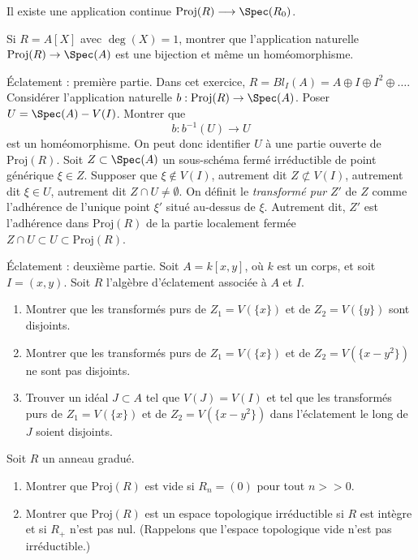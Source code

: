 \begin{remark}
\label{remark-continuous-proj-spec}
Il existe une application continue $ \text{Proj}(R) \longrightarrow \Spec(R_0) $.
\end{remark}

\begin{exercise}
\label{exercise-iso-polynomial-ring-one-variable}
Si $R = A[X]$ avec $\deg(X) = 1$, montrer que l'application naturelle
$\text{Proj}(R) \to \Spec(A)$ est une bijection et même
un homéomorphisme.
\end{exercise}

\begin{exercise}
\label{exercise-blowing-up-I}
Éclatement : première partie.
Dans cet exercice, $R = Bl_I(A) = A \oplus I \oplus I^2 \oplus \ldots$.
Considérer l'application naturelle $b : \text{Proj}(R) \to \Spec(A)$.
Poser $U = \Spec(A) - V(I)$. Montrer que
$$
b : b^{-1}(U) \longrightarrow U
$$
est un homéomorphisme.
On peut donc identifier $U$ à une partie ouverte de $\text{Proj}(R)$.
Soit $Z \subset \Spec(A)$ un sous-schéma fermé irréductible
de point générique $\xi \in Z$. Supposer que $\xi \not\in V(I)$,
autrement dit $Z \not\subset V(I)$, autrement dit
$\xi \in U$, autrement dit $Z\cap U \not = \emptyset$. On définit
le {\it transformé pur} $Z'$ de $Z$ comme l'adhérence de l'unique
point $\xi'$ situé au-dessus de $\xi$. Autrement dit,
$Z'$ est l'adhérence dans $\text{Proj}(R)$ de la partie localement fermée
$Z\cap U \subset U \subset \text{Proj}(R)$.
\end{exercise}

\begin{exercise}
\label{exercise-blowing-up-II}
Éclatement : deuxième partie.
Soit $A = k[x, y]$, où $k$ est un corps, et soit $I = (x, y)$.
Soit $R$ l'algèbre d'éclatement associée à $A$ et $I$.
\begin{enumerate}
\item Montrer que les transformés purs de $Z_1 = V(\{x\})$ et de
$Z_2 = V(\{y\})$ sont disjoints.
\item Montrer que les transformés purs de $Z_1 = V(\{x\})$ et de
$Z_2 = V(\{x-y^2\})$ ne sont pas disjoints.
\item Trouver un idéal $J \subset A$ tel que $V(J) = V(I)$
et tel que les transformés purs de $Z_1 = V(\{x\})$ et de
$Z_2 = V(\{x-y^2\})$ dans l'éclatement le long de $J$ soient disjoints.
\end{enumerate}
\end{exercise}

\begin{exercise}
\label{exercise-proj-when-empty}
Soit $R$ un anneau gradué.
\begin{enumerate}
\item Montrer que $\text{Proj}(R)$ est vide si $R_n = (0)$ pour tout $n >> 0$.
\item Montrer que $\text{Proj}(R)$ est un espace topologique irréductible
si $R$ est intègre et si $R_{+}$ n'est pas nul. (Rappelons que l'espace
topologique vide n'est pas irréductible.)
\end{enumerate}
\end{exercise}

